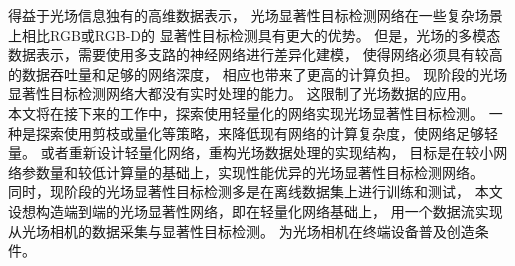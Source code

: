 得益于光场信息独有的高维数据表示，
光场显著性目标检测网络在一些复杂场景上相比RGB或RGB-D的
显著性目标检测具有更大的优势。
但是，光场的多模态数据表示，需要使用多支路的神经网络进行差异化建模，
使得网络必须具有较高的数据吞吐量和足够的网络深度，
相应也带来了更高的计算负担。
现阶段的光场显著性目标检测网络大都没有实时处理的能力。
这限制了光场数据的应用。
\\
%
%
%
%
\indent
本文将在接下来的工作中，探索使用轻量化的网络实现光场显著性目标检测。
一种是探索使用剪枝或量化等策略，来降低现有网络的计算复杂度，使网络足够轻量。
或者重新设计轻量化网络，重构光场数据处理的实现结构，
目标是在较小网络参数量和较低计算量的基础上，实现性能优异的光场显著性目标检测网络。
\\
%
%
%
%
\indent
同时，现阶段的光场显著性目标检测多是在离线数据集上进行训练和测试，
本文设想构造端到端的光场显著性网络，即在轻量化网络基础上，
用一个数据流实现从光场相机的数据采集与显著性目标检测。
为光场相机在终端设备普及创造条件。




















